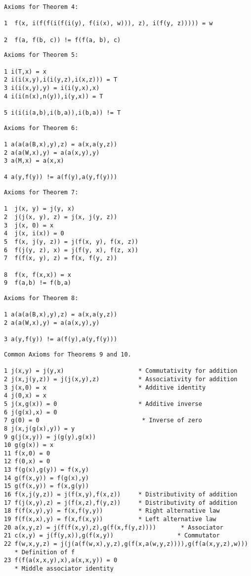 \begin{verbatim}
Axioms for Theorem 4:

1  f(x, i(f(f(i(f(i(y), f(i(x), w))), z), i(f(y, z))))) = w

2  f(a, f(b, c)) != f(f(a, b), c)
\end{verbatim}

\begin{verbatim}       
Axioms for Theorem 5:

1 i(T,x) = x
2 i(i(x,y),i(i(y,z),i(x,z))) = T
3 i(i(x,y),y) = i(i(y,x),x)
4 i(i(n(x),n(y)),i(y,x)) = T

5 i(i(i(a,b),i(b,a)),i(b,a)) != T
\end{verbatim}

\begin{verbatim}
Axioms for Theorem 6:

1 a(a(a(B,x),y),z) = a(x,a(y,z))
2 a(a(W,x),y) = a(a(x,y),y)
3 a(M,x) = a(x,x)

4 a(y,f(y)) != a(f(y),a(y,f(y)))
\end{verbatim}

\begin{verbatim}
Axioms for Theorem 7:

1  j(x, y) = j(y, x)
2  j(j(x, y), z) = j(x, j(y, z))
3  j(x, 0) = x
4  j(x, i(x)) = 0
5  f(x, j(y, z)) = j(f(x, y), f(x, z))
6  f(j(y, z), x) = j(f(y, x), f(z, x))
7  f(f(x, y), z) = f(x, f(y, z))

8  f(x, f(x,x)) = x
9  f(a,b) != f(b,a)
\end{verbatim}
 
\begin{verbatim} 
Axioms for Theorem 8:

1 a(a(a(B,x),y),z) = a(x,a(y,z))
2 a(a(W,x),y) = a(a(x,y),y)

3 a(y,f(y)) != a(f(y),a(y,f(y)))
\end{verbatim}

\begin{verbatim}
Common Axioms for Theorems 9 and 10.

1 j(x,y) = j(y,x)                     * Commutativity for addition 
2 j(x,j(y,z)) = j(j(x,y),z)           * Associativity for addition 
3 j(x,0) = x                          * Additive identity 
4 j(0,x) = x
5 j(x,g(x)) = 0                       * Additive inverse 
6 j(g(x),x) = 0
7 g(0) = 0                             * Inverse of zero
8 j(x,j(g(x),y)) = y
9 g(j(x,y)) = j(g(y),g(x))
10 g(g(x)) = x                          
11 f(x,0) = 0
12 f(0,x) = 0
13 f(g(x),g(y)) = f(x,y)
14 g(f(x,y)) = f(g(x),y)
15 g(f(x,y)) = f(x,g(y))
16 f(x,j(y,z)) = j(f(x,y),f(x,z))     * Distributivity of addition 
17 f(j(x,y),z) = j(f(x,z),f(y,z))     * Distributivity of addition 
18 f(f(x,y),y) = f(x,f(y,y))          * Right alternative law 
19 f(f(x,x),y) = f(x,f(x,y))          * Left alternative law 
20 a(x,y,z) = j(f(f(x,y),z),g(f(x,f(y,z))))       * Associator
21 c(x,y) = j(f(y,x)),g(f(x,y))                  * Commutator 
22 f(w,x,y,z) = j(j(a(f(w,x),y,z),g(f(x,a(w,y,z)))),g(f(a(x,y,z),w)))  
   * Definition of f
23 f(f(a(x,x,y),x),a(x,x,y)) = 0                       
   * Middle associator identity 
\end{verbatim}

